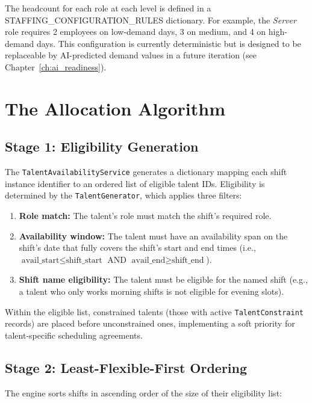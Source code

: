The headcount for each role at each level is defined in a STAFFING\_CONFIGURATION\_RULES dictionary. For example, the \textit{Server} role requires 2 employees on low-demand days, 3 on medium, and 4 on high-demand days. This configuration is currently deterministic but is designed to be replaceable by AI-predicted demand values in a future iteration (see Chapter~\ref{ch:ai_readiness}).

\section{The Allocation Algorithm}

\subsection{Stage 1: Eligibility Generation}

The \texttt{TalentAvailabilityService} generates a dictionary mapping each shift instance identifier to an ordered list of eligible talent IDs. Eligibility is determined by the \texttt{TalentGenerator}, which applies three filters:

\begin{enumerate}
    \item \textbf{Role match:} The talent's role must match the shift's required role.
    \item \textbf{Availability window:} The talent must have an availability span on the shift's date that fully covers the shift's start and end times (i.e., $\text{avail\_start} \leq \text{shift\_start}$ AND $\text{avail\_end} \geq \text{shift\_end}$).
    \item \textbf{Shift name eligibility:} The talent must be eligible for the named shift (e.g., a talent who only works morning shifts is not eligible for evening slots).
\end{enumerate}

Within the eligible list, constrained talents (those with active \texttt{TalentConstraint} records) are placed before unconstrained ones, implementing a soft priority for talent-specific scheduling agreements.

\subsection{Stage 2: Least-Flexible-First Ordering}

The engine sorts shifts in ascending order of the size of their eligibility list:

